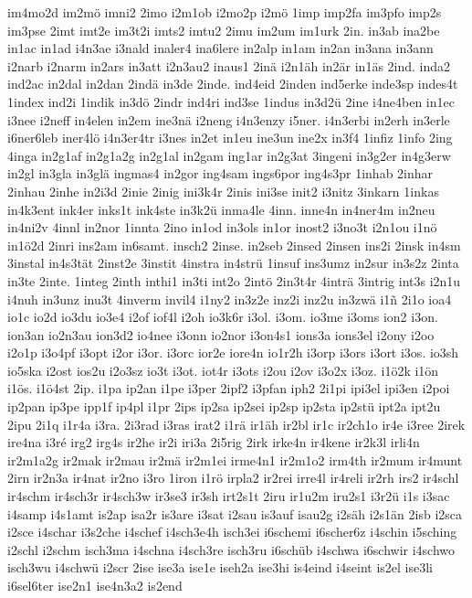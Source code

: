 {im4mo2d
im2mö
imni2
2imo
i2m1ob
i2mo2p
i2mö
1imp
imp2fa
im3pfo
imp2s
im3pse
2imt
imt2e
im3t2i
imts2
imtu2
2imu
im2um
im1urk
2in.
in3ab
ina2be
in1ac
in1ad
i4n3ae
i3nald
inaler4
ina6lere
in2alp
in1am
in2an
in3ana
in3ann
i2narb
i2narm
in2ars
in3att
i2n3au2
inaus1
2inä
i2n1äh
in2är
in1äs
2ind.
inda2
ind2ac
in2dal
in2dan
2indä
in3de
2inde.
ind4eid
2inden
ind5erke
inde3sp
indes4t
1index
ind2i
1indik
in3dö
2indr
ind4ri
ind3se
1indus
in3d2ü
2ine
i4ne4ben
in1ec
i3nee
i2neff
in4elen
in2em
ine3nä
i2neng
i4n3enzy
i5ner.
i4n3erbi
in2erh
in3erle
i6ner6leb
iner4lö
i4n3er4tr
i3nes
in2et
in1eu
ine3un
ine2x
in3f4
1infiz
1info
2ing
4inga
in2g1af
in2g1a2g
in2g1al
in2gam
ing1ar
in2g3at
3ingeni
in3g2er
in4g3erw
in2gl
in3gla
in3glä
ingmas4
in2gor
ing4sam
ings6por
ing4s3pr
1inhab
2inhar
2inhau
2inhe
in2i3d
2inie
2inig
ini3k4r
2inis
ini3se
init2
i3nitz
3inkarn
1inkas
in4k3ent
ink4er
inks1t
ink4ste
in3k2ü
inma4le
4inn.
inne4n
in4ner4m
in2neu
in4ni2v
4innl
in2nor
1innta
2ino
in1od
in3ols
in1or
inost2
i3no3t
i2n1ou
i1nö
in1ö2d
2inri
ins2am
in6samt.
insch2
2inse.
in2seb
2insed
2insen
ins2i
2insk
in4sm
3instal
in4s3tät
2inst2e
3instit
4instra
in4strü
1insuf
ins3umz
in2sur
in3s2z
2inta
in3te
2inte.
1integ
2inth
inthi1
in3ti
int2o
2intö
2in3t4r
4inträ
3intrig
int3s
i2n1u
i4nuh
in3unz
inu3t
4inverm
invil4
i1ny2
in3z2e
inz2i
inz2u
in3zwä
i1ñ
2i1o
ioa4
io1c
io2d
io3du
io3e4
i2of
iof4l
i2oh
io3k6r
i3ol.
i3om.
io3me
i3oms
ion2
i3on.
ion3an
io2n3au
ion3d2
io4nee
i3onn
io2nor
i3on4s1
ions3a
ions3el
i2ony
i2oo
i2o1p
i3o4pf
i3opt
i2or
i3or.
i3orc
ior2e
iore4n
io1r2h
i3orp
i3ors
i3ort
i3os.
io3sh
io5ska
i2ost
ios2u
i2o3sz
io3t
i3ot.
iot4r
i3ots
i2ou
i2ov
i3o2x
i3oz.
i1ö2k
i1ön
i1ös.
i1ö4st
2ip.
i1pa
ip2an
i1pe
i3per
2ipf2
i3pfan
iph2
2i1pi
ipi3el
ipi3en
i2poi
ip2pan
ip3pe
ipp1f
ip4pl
i1pr
2ips
ip2sa
ip2sei
ip2sp
ip2sta
ip2stü
ipt2a
ipt2u
2ipu
2i1q
i1r4a
i3ra.
2i3rad
i3ras
irat2
i1rä
ir1äh
ir2bl
ir1c
ir2ch1o
ir4e
i3ree
2irek
ire4na
i3ré
irg2
irg4s
ir2he
ir2i
iri3a
2i5rig
2irk
irke4n
ir4kene
ir2k3l
irli4n
ir2m1a2g
ir2mak
ir2mau
ir2mä
ir2m1ei
irme4n1
ir2m1o2
irm4th
ir2mum
ir4munt
2irn
ir2n3a
ir4nat
ir2no
i3ro
1iron
i1rö
irpla2
ir2rei
irre4l
ir4reli
ir2rh
irs2
ir4schl
ir4schm
ir4sch3r
ir4sch3w
ir3se3
ir3sh
irt2s1t
2iru
ir1u2m
iru2s1
i3r2ü
i1s
i3sac
i4samp
i4s1amt
is2ap
isa2r
is3are
i3sat
i2sau
is3auf
isau2g
i2säh
i2s1än
2isb
i2sca
i2sce
i4schar
i3s2che
i4schef
i4sch3e4h
isch3ei
i6schemi
i6scher6z
i4schin
i5sching
i2schl
i2schm
isch3ma
i4schna
i4sch3re
isch3ru
i6schüb
i4schwa
i6schwir
i4schwo
isch3wu
i4schwü
i2scr
2ise
ise3a
ise1e
iseh2a
ise3hi
is4eind
i4seint
is2el
ise3li
i6sel6ter
ise2n1
ise4n3a2
is2end
}
